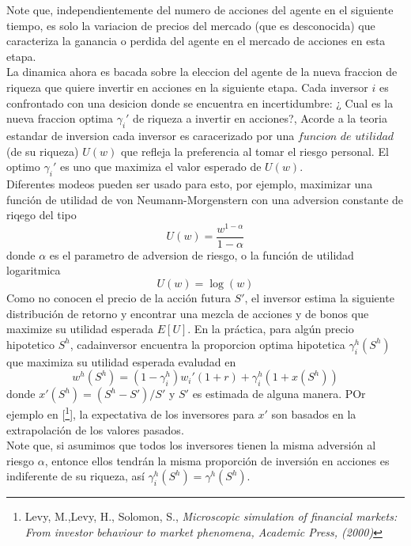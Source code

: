 \documentclass[12pt]{article}
\begin{document}
Note que, independientemente del numero de acciones del agente en el siguiente tiempo, es solo la variacion de precios del mercado (que es desconocida) que caracteriza la ganancia o perdida del agente en el mercado de acciones en esta etapa.\\
\quad La dinamica ahora es bacada sobre la eleccion del agente de la nueva fraccion de riqueza que quiere invertir en acciones en la siguiente etapa. Cada inversor $i$ es confrontado con una desicion donde se encuentra en incertidumbre: ¿ Cual es la nueva fraccion optima $\gamma_i'$ de riqueza a invertir en acciones?, Acorde a la teoria estandar de inversion cada inversor es caracerizado por una $ \textit{funcion de utilidad}$ (de su riqueza) $U(w)$ que refleja la preferencia al tomar el riesgo personal. El optimo $\gamma_i'$ es uno que maximiza el valor esperado de $U(w)$.\\
\quad Diferentes modeos pueden ser usado para esto, por ejemplo, maximizar una función de utilidad de von Neumann-Morgenstern con una adversion constante de riqego del tipo
\begin{equation}
U(w)= \frac{w^{1-\alpha}}{1-\alpha}
\end{equation}
donde $\alpha$ es el parametro de adversion de riesgo, o la función de utilidad logaritmica
\begin{equation}
U(w)=\log{(w)}
\end{equation}
Como no conocen el precio de la acción futura $S'$, el inversor estima la siguiente distribución de retorno y encontrar una mezcla de acciones y de bonos que maximize su utilidad esperada $E[U]$. En la práctica, para algún precio hipotetico $S^{h}$, cadainversor encuentra la proporcion optima hipotetica $\gamma_i^{h}(S^h)$ que maximiza su utilidad esperada evaludad en
\begin{equation}
w^h(S^h)=(1-\gamma^h_i)w_i'(1+r) +\gamma^h_i(1+x(S^h))
\end{equation}
donde $x'(S^h)=(S^h-S')/S'$ y $S'$ es estimada de alguna manera. POr ejemplo en [\footnote{Levy, M.,Levy, H., Solomon, S., \textit{Microscopic simulation of financial markets: From investor behaviour to market phenomena, Academic Press, (2000)}}], la expectativa de los inversores para  $x'$ son basados en la extrapolación de los valores pasados.\\
\quad Note que, si asumimos que todos los inversores tienen la misma adversión al riesgo $\alpha$, entonce ellos tendrán la misma proporción de inversión en acciones es indiferente de su riqueza, así $\gamma^{h}_i(S^{h})=\gamma^{h}(S^{h})$.\\
\end{document}
